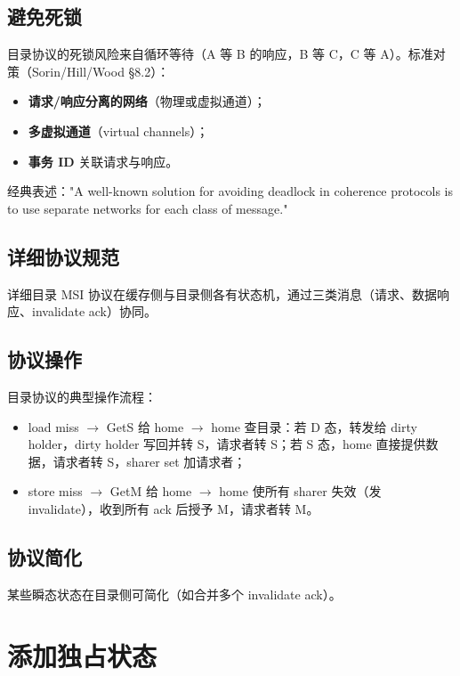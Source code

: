 \subsection{避免死锁}

目录协议的死锁风险来自循环等待（A 等 B 的响应，B 等 C，C 等 A）。标准对策（Sorin/Hill/Wood §8.2）：

\begin{itemize}
\item \textbf{请求/响应分离的网络}（物理或虚拟通道）；
\item \textbf{多虚拟通道}（virtual channels）；
\item \textbf{事务 ID} 关联请求与响应。
\end{itemize}


经典表述："A well-known solution for avoiding deadlock in coherence protocols is to use separate networks for each class of message."

\subsection{详细协议规范}

详细目录 MSI 协议在缓存侧与目录侧各有状态机，通过三类消息（请求、数据响应、invalidate ack）协同。

\subsection{协议操作}

目录协议的典型操作流程：

\begin{itemize}
\item load miss $\rightarrow$ GetS 给 home $\rightarrow$ home 查目录：若 D 态，转发给 dirty holder，dirty holder 写回并转 S，请求者转 S；若 S 态，home 直接提供数据，请求者转 S，sharer set 加请求者；
\item store miss $\rightarrow$ GetM 给 home $\rightarrow$ home 使所有 sharer 失效（发 invalidate），收到所有 ack 后授予 M，请求者转 M。
\end{itemize}


\subsection{协议简化}

某些瞬态状态在目录侧可简化（如合并多个 invalidate ack）。

\section{添加独占状态}

